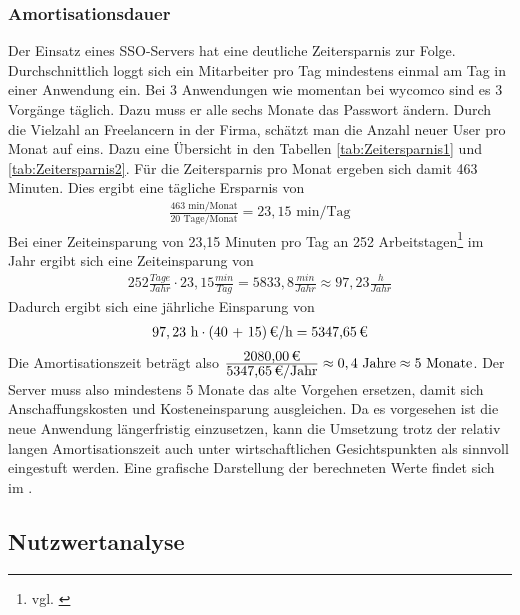 
\subsubsection{Amortisationsdauer}
\label{sec:Amortisationsdauer}

Der Einsatz eines \ac{SSO}-Servers hat eine deutliche Zeitersparnis zur Folge. Durchschnittlich loggt sich ein Mitarbeiter pro Tag mindestens einmal am Tag in einer Anwendung ein. Bei 3 Anwendungen wie momentan bei wycomco sind es 3 Vorgänge täglich. Dazu muss er alle sechs Monate das Passwort ändern. Durch die Vielzahl an Freelancern in der Firma, schätzt man die Anzahl neuer User pro Monat auf eins. 
Dazu eine Übersicht in den Tabellen \ref{tab:Zeitersparnis1} und \ref{tab:Zeitersparnis2}.
Für die Zeitersparnis pro Monat ergeben sich damit 463 Minuten. 
Dies ergibt eine tägliche Ersparnis von
\begin{eqnarray}
\frac{463 \mbox{ min/Monat}}{20 \mbox{ Tage/Monat}} = 23,15 \mbox{ min/Tag}
\end{eqnarray}
Bei einer Zeiteinsparung von 23,15 Minuten pro Tag an 252 Arbeitstagen\footnote{vgl. \cite{arbeitstage}} im Jahr ergibt sich eine Zeiteinsparung von 
\begin{eqnarray}
252 \frac{Tage}{Jahr} \cdot 23,15 \frac{min}{Tag} = 5833,8 \frac{min}{Jahr} \approx 97,23 \frac{h}{Jahr} 
\end{eqnarray}
Dadurch ergibt sich eine jährliche Einsparung von 
\begin{eqnarray}
97,23 \mbox{ h} \cdot \eur{(40 + 15)}{\mbox{/h}} = \eur{5347,65}
\end{eqnarray}
Die Amortisationszeit beträgt also $\frac{\eur{2080,00}}{\eur{5347,65}\mbox{/Jahr}} \approx 0,4 \mbox{ Jahre} \approx 5 \mbox{ Monate}$.
Der Server muss also mindestens 5 Monate das alte Vorgehen ersetzen, damit sich Anschaffungskosten und Kosteneinsparung ausgleichen. Da es vorgesehen ist die neue Anwendung längerfristig einzusetzen, kann die Umsetzung trotz der relativ langen Amortisationszeit auch unter wirtschaftlichen Gesichtspunkten als sinnvoll eingestuft werden.
Eine grafische Darstellung der berechneten Werte findet sich im .

\subsection{Nutzwertanalyse}
\label{sec:Nutzwertanalyse}

